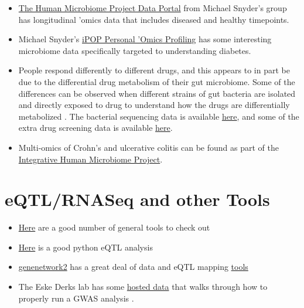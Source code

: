 \documentclass[]{book}
\providecommand{\tightlist}{%
  \setlength{\itemsep}{0pt}\setlength{\parskip}{0pt}}
\begin{document}
\begin{itemize}
\tightlist
\item
  \href{https://portal.hmpdacc.org/}{The Human Microbiome Project Data Portal} from Michael Snyder's group has longitudinal 'omics data that includes diseased and healthy timepoints.
\item
  Michael Snyder's \href{http://med.stanford.edu/ipop.html}{iPOP Personal 'Omics Profiling} has some interesting microbiome data specifically targeted to understanding diabetes.
\item
  People respond differently to different drugs, and this appears to in part be due to the differential drug metabolism of their gut microbiome. Some of the differences can be observed when different strains of gut bacteria are isolated and directly exposed to drug to understand how the drugs are differentially metabolized \citep{zimmermann2019mapping}. The bacterial sequencing data is available \href{https://www.ebi.ac.uk/ena/data/search?query=PRJEB31790}{here}, and some of the extra drug
  screening data is available \href{https://figshare.com/articles/Mapping_human_microbiome_drug_metabolism_by_gut_bacteria_and_their_genes/8119058}{here}.
\item
  Multi-omics of Crohn's and ulcerative colitis can be found as part of the \href{https://www.ibdmdb.org/}{Integrative Human Microbiome Project}.
\end{itemize}

\hypertarget{eqtlrnaseq-and-other-tools}{%
\section{eQTL/RNASeq and other Tools}\label{eqtlrnaseq-and-other-tools}}

\begin{itemize}
\tightlist
\item
  \href{https://adinasarapu.github.io/year-archive/}{Here} are a good number of general tools to check out
\item
  \href{https://github.com/molgenis/systemsgenetics/wiki/eQTL-mapping-analysis-cookbook-for-RNA-seq-data}{Here} is a good python eQTL analysis
\item
  \href{http://gn2.genenetwork.org/}{genenetwork2} has a great deal of data and eQTL mapping \href{https://github.com/genenetwork/genenetwork2}{tools}
\item
  The Eske Derks lab has some \href{https://github.com/MareesAT/GWA_tutorial/}{hosted data} that walks through how to properly run a GWAS analysis \citep{Marees2018-rc}.
\end{itemize}
\end{document}
